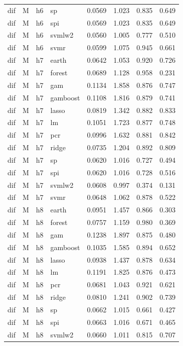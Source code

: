 \begin{ThreePartTable}
\begin{longtable}[t]{llclcccc}
dif & M & h6 & sp & 0.0569 & 1.023 & 0.835 & 0.649\\
dif & M & h6 & spi & 0.0569 & 1.023 & 0.835 & 0.649\\
dif & M & h6 & svmlw2 & 0.0560 & 1.005 & 0.777 & 0.510\\
dif & M & h6 & svmr & 0.0599 & 1.075 & 0.945 & 0.661\\
\addlinespace
dif & M & h7 & earth & 0.0642 & 1.053 & 0.920 & 0.726\\
dif & M & h7 & forest & 0.0689 & 1.128 & 0.958 & 0.231\\
dif & M & h7 & gam & 0.1134 & 1.858 & 0.876 & 0.747\\
dif & M & h7 & gamboost & 0.1108 & 1.816 & 0.879 & 0.741\\
dif & M & h7 & lasso & 0.0819 & 1.342 & 0.882 & 0.833\\
dif & M & h7 & lm & 0.1051 & 1.723 & 0.877 & 0.748\\
dif & M & h7 & pcr & 0.0996 & 1.632 & 0.881 & 0.842\\
dif & M & h7 & ridge & 0.0735 & 1.204 & 0.892 & 0.809\\
dif & M & h7 & sp & 0.0620 & 1.016 & 0.727 & 0.494\\
dif & M & h7 & spi & 0.0620 & 1.016 & 0.728 & 0.516\\
dif & M & h7 & svmlw2 & 0.0608 & 0.997 & 0.374 & 0.131\\
dif & M & h7 & svmr & 0.0648 & 1.062 & 0.878 & 0.522\\
\addlinespace
dif & M & h8 & earth & 0.0951 & 1.457 & 0.866 & 0.303\\
dif & M & h8 & forest & 0.0757 & 1.159 & 0.980 & 0.369\\
dif & M & h8 & gam & 0.1238 & 1.897 & 0.875 & 0.480\\
dif & M & h8 & gamboost & 0.1035 & 1.585 & 0.894 & 0.652\\
dif & M & h8 & lasso & 0.0938 & 1.437 & 0.878 & 0.634\\
dif & M & h8 & lm & 0.1191 & 1.825 & 0.876 & 0.473\\
dif & M & h8 & pcr & 0.0681 & 1.043 & 0.921 & 0.621\\
dif & M & h8 & ridge & 0.0810 & 1.241 & 0.902 & 0.739\\
dif & M & h8 & sp & 0.0662 & 1.015 & 0.661 & 0.427\\
dif & M & h8 & spi & 0.0663 & 1.016 & 0.671 & 0.465\\
dif & M & h8 & svmlw2 & 0.0660 & 1.011 & 0.815 & 0.707\\

\end{longtable}
\end{ThreePartTable}
